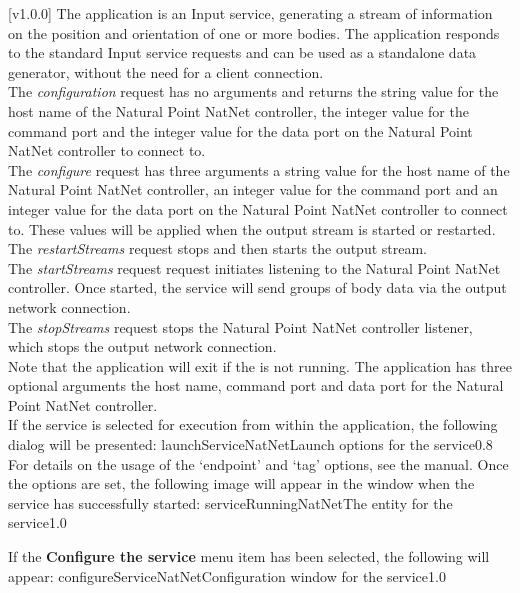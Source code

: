 [v1.0.0]
The  application is an Input service,
generating a stream of information on the position and orientation of one or more bodies.
The application responds to the standard Input service requests and can be used as a
standalone data generator, without the need for a client connection.\\

The \emph{configuration} request has no arguments and returns the string value for the
host name of the Natural Point NatNet controller, the integer value for the command port
and the integer value for the data port on the Natural Point NatNet controller to connect
to.\\

The \emph{configure} request has three arguments \longDash{} a string value for the host
name of the Natural Point NatNet controller, an integer value for the command port and an
integer value for the data port on the Natural Point NatNet controller to connect to.
These values will be applied when the output stream is started or restarted.\\ 

The \emph{restartStreams} request stops and then starts the output stream.\\

The \emph{startStreams} request request initiates listening to the Natural Point NatNet
controller.
Once started, the service will send groups of body data via the output \yarp{} network
connection.\\

The \emph{stopStreams} request stops the Natural Point NatNet controller listener, which
stops the output \yarp{} network connection.\\ 

Note that the application will exit if the \emph{\RS} is not running.
The application has three optional arguments \longDash{} the host name, command port and
data port for the Natural Point NatNet controller.
\insertAppParameters
\insertTagDescription{\NNI}
\insertInputServiceComment\\

\insertStandardServiceCommands
\secondaryEnd
{}
If the service is selected for execution from within the \emph{\MMMU} application, the
following dialog will be presented:
%
{launchServiceNatNet}{Launch options for the \emph{\NNI} service}{0.8}
\condPage{}
For details on the usage of the `endpoint' and `tag' options, see the \emph{\MMMU} manual.
Once the options are set, the following image will appear in the \emph{\MMMU} window when
the service has successfully started:
%
{serviceRunningNatNet}{The \emph{\MMMU} entity for the \emph{\NNI} service}{1.0}

If the \textbf{Configure the service} menu item has been selected, the following will
appear:
%
{configureServiceNatNet}{Configuration window for the \emph{\NNI} service}{1.0}
\secondaryEnd
\primaryEnd{}
